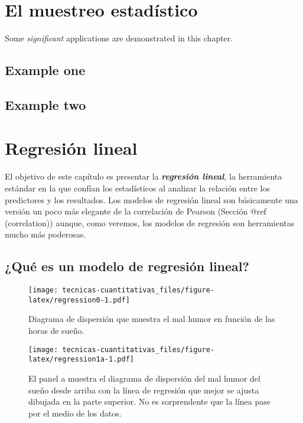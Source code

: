 \documentclass[
]{book}
\begin{document}
\hypertarget{el-muestreo-estaduxedstico}{%
\chapter{El muestreo estadístico}\label{el-muestreo-estaduxedstico}}

Some \emph{significant} applications are demonstrated in this chapter.

\hypertarget{example-one}{%
\section{Example one}\label{example-one}}

\hypertarget{example-two}{%
\section{Example two}\label{example-two}}

\hypertarget{regression}{%
\chapter{Regresión lineal}\label{regression}}

El objetivo de este capítulo es presentar la \textbf{\emph{regresión lineal}}, la herramienta estándar en la que confían los estadísticos al analizar la relación entre los predictores y los resultados. Los modelos de regresión lineal son básicamente una versión un poco más elegante de la correlación de Pearson (Sección @ref (correlation)) aunque, como veremos, los modelos de regresión son herramientas mucho más poderosas.

\hypertarget{intro-regression}{%
\section{¿Qué es un modelo de regresión lineal?}\label{intro-regression}}

\begin{figure}
\centering
\texttt{[image: tecnicas-cuantitativas\_files/figure-latex/regression0-1.pdf]}
\caption{\label{fig:regression0}Diagrama de dispersión que muestra el mal humor en función de las horas de sueño.}
\end{figure}

\begin{figure}
\centering
\texttt{[image: tecnicas-cuantitativas\_files/figure-latex/regression1a-1.pdf]}
\caption{\label{fig:regression1a}El panel a muestra el diagrama de dispersión del mal humor del sueño desde arriba con la línea de regresión que mejor se ajusta dibujada en la parte superior. No es sorprendente que la línea pase por el medio de los datos.}
\end{figure}
\end{document}
